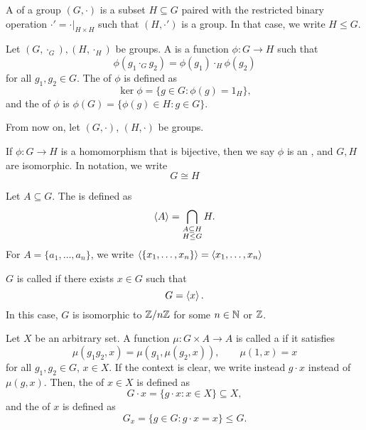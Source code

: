 \documentclass[class=report, crop=false]{standalone}
\begin{document}
\begin{definition}
    A  of a group $(G,\cdot)$ is a subset $H\subseteq G$ paired with the restricted binary operation $\cdot' = \left. \cdot \right|_{H\times H}$ such that $(H,\cdot')$ is a group. In that case, we write $H\le G$.
\end{definition}

\begin{definition}
    Let $(G,\cdot_G),(H,\cdot_H)$ be groups. A  is a function $\phi: G\to H$ such that
    \[\phi(g_1\cdot_G g_2) = \phi(g_1)\cdot_H \phi(g_2)\]
    for all $g_1,g_2\in G$. The  of $\phi$ is defined as
    \[\ker{\phi}=\{g\in G: \phi(g)=1_H\},\]
    and the  of $\phi$ is $\phi(G)=\{\phi(g)\in H: g\in G\}$.
\end{definition}

\bigskip
\noindent From now on, let $(G,\cdot)$, $(H,\cdot)$ be groups.
\bigskip

\begin{definition}
    If $\phi: G\to H$ is a homomorphism that is bijective, then we say $\phi$ is an , and $G,H$ are isomorphic. In notation, we write
    \[G \cong H\]
\end{definition}

\begin{definition}
    Let $A\subseteq G$. The  is defined as
    \[\left\langle A\right\rangle=\bigcap_{\substack{A\subseteq H\\ H\leq G}} H.\]
    For $A=\{a_1,\dots,a_n\}$, we write $\left\langle\{x_1,\dots,x_n\}\right\rangle=\left\langle x_1,\dots,x_n\right\rangle$
\end{definition}

\begin{definition}
    $G$ is called  if there exists $x\in G$ such that
    \[G=\left\langle x\right\rangle.\]
    In this case, $G$ is isomorphic to $\mathbb{Z}/n\mathbb{Z}$ for some $n\in \mathbb{N}$ or $\mathbb{Z}$.
\end{definition}

\begin{definition}
    Let $X$ be an arbitrary set. A function $\mu: G\times A \to A$ is called a  if it satisfies
    \[\mu(g_1 g_2, x) = \mu(g_1, \mu(g_2,x)), \qquad \mu(1,x) = x\]
    for all $g_1,g_2\in G$, $x\in X$. If the context is clear, we write instead $g\cdot x$ instead of $\mu(g,x)$. Then, the  of $x\in X$ is defined as
    \[G\cdot x = \{g\cdot x: x\in X\} \subseteq X,\]
    and the  of $x$ is defined as
    \[G_x = \{g\in G: g\cdot x = x\} \leq G.\]
\end{definition}
\end{document}
